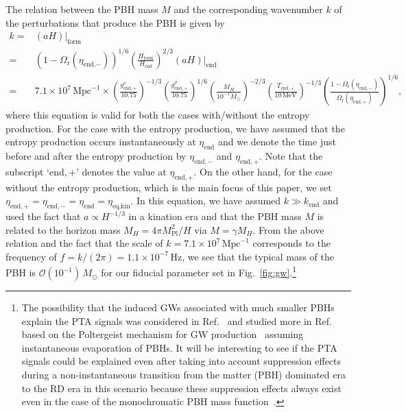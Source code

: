 \documentclass[superscriptaddress, aps, preprintnumbers,
amsmath, amssymb, sort&compress, nofootinbib, 10pt, paper, floatfix]{revtex4-2}
\newcommand{\Hz}{\text{Hz}}
\newcommand{\Pl}{\text{Pl}}
\newcommand{\en}{{\text{end}}}
\newcommand{\eq}{{\text{eq}}}
\newcommand{\Mpc}{{\text{Mpc}}}
\newcommand{\kk}{\text{kin}}
\begin{document}
The relation between the PBH mass $M$ and the corresponding wavenumber $k$ of the perturbations that produce the PBH is given by
\begin{align}
    k =& (a H)|_\text{form} \nonumber \\
      =& (1 - \Omega_\text{r} (\eta_{\text{end,}-}))^{1/6} \left( \frac{H_\text{form}}{H_\text{end}} \right)^{2/3} (a H)|_\text{end} \nonumber \\
      = & 7.1 \times 10^7 \, \mathrm{Mpc}^{-1} \times \left( \frac{g^s_{\en,+}}{10.75} \right)^{-1/3} \left( \frac{g^\rho_{\en,+}}{10.75} \right)^{1/6} \left( \frac{M_H}{10^{-1} M_\odot} \right)^{-2/3} \left( \frac{T_{\en,+}}{10 \, \mathrm{MeV}} \right)^{-1/3} \left(\frac{1-\Omega_\text{r}(\eta_{\text{end},-})}{\Omega_\text{r}(\eta_{\text{end},+})} \right)^{1/6},
\end{align}
where this equation is valid for both the cases with/without the entropy production.
For the case with the entropy production, we have assumed that the entropy production occurs instantaneously at $\eta_\en$ and we denote the time just before and after the entropy production by $\eta_{\en,-}$ and $\eta_{\en,+}$.
Note that the subscript `$\en,+$' denotes the value at $\eta_{\en,+}$.
On the other hand, for the case without the entropy production, which is the main focus of this paper, we set $\eta_{\en,+}=\eta_{\en,-}=\eta_\en = \eta_{\eq,\kk}$.
In this equation, we have assumed $k \gg k_\text{end}$ and used the fact that $a \propto H^{-1/3}$ in a kination era and that the PBH mass $M$ is related to the horizon mass $M_H = 4\pi M_\Pl^2 / H$ via $M = \gamma M_H$. 
From the above relation and the fact that the scale of $k=7.1\times 10^7\,\Mpc^{-1}$ corresponds to the frequency of $f = k/(2\pi)=1.1\times 10^{-7}\,\Hz$, we see that the typical mass of the PBH is $\mathcal{O}(10^{-1}) \, M_\odot$ for our fiducial parameter set in Fig.~\ref{fig:gw}.\footnote{
The possibility that the induced GWs associated with much smaller PBHs explain the PTA signals was considered in Ref.~\cite{Papanikolaou:2020qtd} and studied more in Ref.~\cite{Bhaumik:2023wmw} based on the Poltergeist mechanism for GW production~\cite{Inomata:2019ivs, Inomata:2020lmk} assuming instantaneous evaporation of PBHs. It will be interesting to see if the PTA signals could be explained even after taking into account suppression effects~\cite{Inomata:2019zqy, Inomata:2020lmk} during a  non-instantaneous transition from the matter (PBH) dominated era to the RD era in this scenario because these suppression effects always exist even in the case of the monochromatic PBH mass function~\cite{Inomata:2020lmk}.
} 
\end{document}
